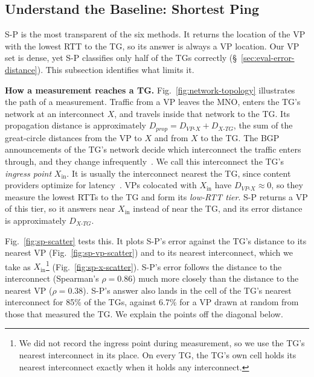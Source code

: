 
\subsection{Understand the Baseline: Shortest Ping}
\label{sec:err-characterization-sp}

S-P is the most transparent of the six methods. It returns the location of the VP with the lowest RTT to the TG, so its answer is always a VP location. Our VP set is dense, yet S-P classifies only half of the TGs correctly (\S~\ref{sec:eval-error-distance}). This subsection identifies what limits it.

\noindent \textbf{How a measurement reaches a TG.} Fig.~\ref{fig:network-topology} illustrates the path of a measurement. Traffic from a VP leaves the MNO, enters the TG's network at an interconnect $X$, and travels inside that network to the TG. Its propagation distance is approximately $D_{prop} = D_{VP\text{-}X} + D_{X\text{-}TG}$, the sum of the great-circle distances from the VP to $X$ and from $X$ to the TG. The BGP announcements of the TG's network decide which interconnect the traffic enters through, and they change infrequently~. We call this interconnect the TG's \emph{ingress point} $X_{\mathrm{in}}$. It is usually the interconnect nearest the TG, since content providers optimize for latency~. VPs colocated with $X_{\mathrm{in}}$ have $D_{VP\text{-}X} \approx 0$, so they measure the lowest RTTs to the TG and form its \emph{low-RTT tier}. S-P returns a VP of this tier, so it answers near $X_{\mathrm{in}}$ instead of near the TG, and its error distance is approximately $D_{X\text{-}TG}$.

Fig.~\ref{fig:sp-scatter} tests this. It plots S-P's error against the TG's distance to its nearest VP (Fig.~\ref{fig:sp-vp-scatter}) and to its nearest interconnect, which we take as $X_{\mathrm{in}}$\footnote{We did not record the ingress point during measurement, so we use the TG's nearest interconnect in its place. On every TG, the TG's own cell holds its nearest interconnect exactly when it holds any interconnect.} (Fig.~\ref{fig:sp-x-scatter}). S-P's error follows the distance to the interconnect (Spearman's $\rho = 0.86$) much more closely than the distance to the nearest VP ($\rho = 0.38$). S-P's answer also lands in the cell of the TG's nearest interconnect for 85\% of the TGs, against 6.7\% for a VP drawn at random from those that measured the TG. We explain the points off the diagonal below. 


